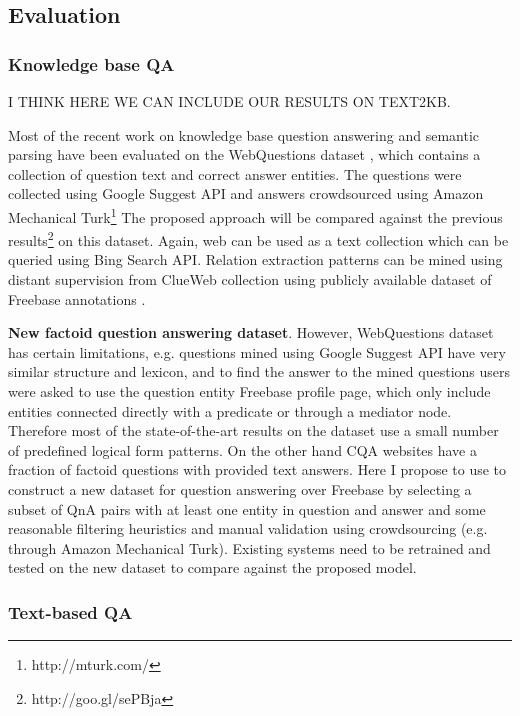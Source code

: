 \subsection{Evaluation}
\label{sec:factoid_evaluation}

\subsubsection{Knowledge base QA}

I THINK HERE WE CAN INCLUDE OUR RESULTS ON TEXT2KB.

Most of the recent work on knowledge base question answering and semantic parsing have been evaluated on the WebQuestions dataset \cite{BerantCFL13:sempre}, which contains a collection of question text and correct answer entities.
The questions were collected using Google Suggest API and answers crowdsourced using Amazon Mechanical Turk\footnote{http://mturk.com/}
The proposed approach will be compared against the previous results\footnote{http://goo.gl/sePBja} on this dataset.
Again, web can be used as a text collection which can be queried using Bing Search API.
Relation extraction patterns can be mined using distant supervision from ClueWeb collection using publicly available dataset of Freebase annotations \cite{gabrilovich2013facc1}.

\textbf{New factoid question answering dataset}.
However, WebQuestions dataset has certain limitations, e.g. questions mined using Google Suggest API have very similar structure and lexicon, and to find the answer to the mined questions users were asked to use the question entity Freebase profile page,  which only include entities connected directly with a predicate or through a mediator node.
Therefore most of the state-of-the-art results on the dataset use a small number of predefined logical form patterns.
On the other hand CQA websites have a fraction of factoid questions with provided text answers.
Here I propose to use to construct a new dataset for question answering over Freebase by selecting a subset of QnA pairs with at least one entity in question and answer and some reasonable filtering heuristics and manual validation using crowdsourcing (e.g. through Amazon Mechanical Turk).
Existing systems need to be retrained and tested on the new dataset to compare against the proposed model.

\subsubsection{Text-based QA}

